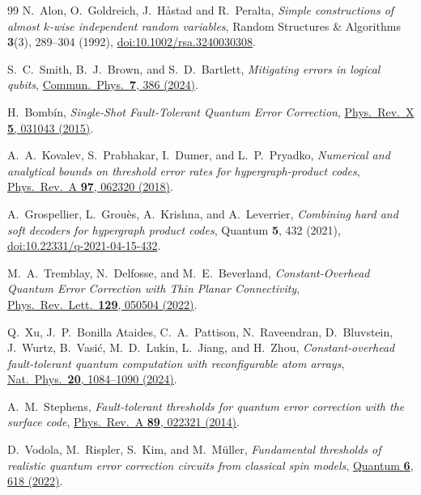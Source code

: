 \documentclass[10pt,twocolumn]{article}
\theoremstyle{definition}
\begin{document}
\begin{thebibliography}{99}
N.~Alon, O.~Goldreich, J.~H{\aa}stad and R.~Peralta,
\emph{Simple constructions of almost $k$-wise independent random variables},
Random Structures \& Algorithms \textbf{3}(3), 289--304 (1992),
\href{https://doi.org/10.1002/rsa.3240030308}{doi:10.1002/rsa.3240030308}.

S.~C.~Smith, B.~J.~Brown, and S.~D.~Bartlett,
\emph{Mitigating errors in logical qubits},
\href{https://doi.org/10.1038/s42005-024-01883-4}{Commun.\ Phys.\ \textbf{7}, 386 (2024)}.

H.~Bomb\'in, \emph{Single-Shot Fault-Tolerant Quantum Error Correction},
\href{https://doi.org/10.1103/PhysRevX.5.031043}{Phys.\ Rev.\ X \textbf{5}, 031043 (2015)}.

A.~A.~Kovalev, S.~Prabhakar, I.~Dumer, and L.~P.~Pryadko,
\emph{Numerical and analytical bounds on threshold error rates for
hypergraph-product codes},
\href{https://doi.org/10.1103/PhysRevA.97.062320}{Phys.\ Rev.\ A
\textbf{97}, 062320 (2018)}.

A.~Grospellier, L.~Grouès, A.~Krishna, and A.~Leverrier,
\emph{Combining hard and soft decoders for hypergraph product codes},
Quantum \textbf{5}, 432 (2021),
\href{https://doi.org/10.22331/q-2021-04-15-432}{doi:10.22331/q-2021-04-15-432}.

M.~A.~Tremblay, N.~Delfosse, and M.~E.~Beverland,
\emph{Constant-Overhead Quantum Error Correction with Thin Planar Connectivity},
\href{https://doi.org/10.1103/PhysRevLett.129.050504}{Phys.\ Rev.\ Lett.\ \textbf{129}, 050504 (2022)}.

Q.~Xu, J.~P.~Bonilla Ataides, C.~A.~Pattison, N.~Raveendran, D.~Bluvstein,
J.~Wurtz, B.~Vasi\'c, M.~D.~Lukin, L.~Jiang, and H.~Zhou,
\emph{Constant-overhead fault-tolerant quantum computation with reconfigurable atom arrays},
\href{https://doi.org/10.1038/s41567-024-02479-z}{Nat.\ Phys.\ \textbf{20}, 1084--1090 (2024)}.

A.~M.~Stephens, \emph{Fault-tolerant thresholds for quantum error correction with the surface code},
\href{https://doi.org/10.1103/PhysRevA.89.022321}{Phys.\ Rev.\ A \textbf{89}, 022321 (2014)}.

D.~Vodola, M.~Rispler, S.~Kim, and M.~M\"uller,
\emph{Fundamental thresholds of realistic quantum error correction circuits from classical spin models},
\href{https://doi.org/10.22331/q-2022-01-05-618}{Quantum \textbf{6}, 618 (2022)}.


\end{thebibliography}
\end{document}
